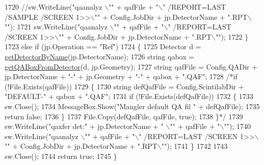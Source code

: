 \begin{DoxyCode}
1720                 \textcolor{comment}{//sw.WriteLine("qaanalyz \(\backslash\)"" + qafFile + "\(\backslash\)" /REPORT=LAST /SAMPLE /SCREEN 1>>\(\backslash\)"" +
       Config.JobDir + jp.DetectorName + ".RPT\(\backslash\)"");}
1721                 sw.WriteLine(\textcolor{stringliteral}{"qaanalyz \(\backslash\)""} + qafFile + \textcolor{stringliteral}{"\(\backslash\)" /REPORT=LAST /SCREEN 1>>\(\backslash\)""} + Config.JobDir + 
      jp.DetectorName + \textcolor{stringliteral}{".RPT\(\backslash\)""});
1722             \}
1723             \textcolor{keywordflow}{else} \textcolor{keywordflow}{if} (jp.Operation == \textcolor{stringliteral}{"Ref"})
1724             \{
1725                 Detector d = \hyperlink{class_scintilab_1_1_form_main_aff4482e0919480013a53fe56cfb374ba}{getDetectorByName}(jp.DetectorName);
1726                 \textcolor{keywordtype}{string} qabox = \hyperlink{class_scintilab_1_1_form_main_ad8de93638ebc50f712d85af269ba383d}{getQABoxFromDetector}(d, jp.Geometry);
1727                 \textcolor{keywordtype}{string} qafFile = Config.QADir + jp.DetectorName + \textcolor{stringliteral}{"-"} + jp.Geometry + \textcolor{stringliteral}{"-"} + qabox + \textcolor{stringliteral}{".QAF"};
1728                 \textcolor{comment}{/*if (!File.Exists(qafFile))}
1729 \textcolor{comment}{                \{}
1730 \textcolor{comment}{                    string defQafFile = Config.ScintilabDir + "DEFAULT-" + qabox + ".QAF";}
1731 \textcolor{comment}{                    if (!File.Exists(defQafFile))}
1732 \textcolor{comment}{                    \{}
1733 \textcolor{comment}{                        sw.Close();}
1734 \textcolor{comment}{                        MessageBox.Show("Mangler default QA fil " + defQafFile);}
1735 \textcolor{comment}{                        return false;}
1736 \textcolor{comment}{                    \}}
1737 \textcolor{comment}{                    File.Copy(defQafFile, qafFile, true);}
1738 \textcolor{comment}{                \}*/}
1739                 sw.WriteLine(\textcolor{stringliteral}{"qaxfer det:"} + jp.DetectorName + \textcolor{stringliteral}{" \(\backslash\)""} + qafFile + \textcolor{stringliteral}{"\(\backslash\)""});
1740                 sw.WriteLine(\textcolor{stringliteral}{"qaanalyz \(\backslash\)""} + qafFile + \textcolor{stringliteral}{"\(\backslash\)" /REPORT=LAST /SCREEN 1>>\(\backslash\)""} + Config.JobDir + 
      jp.DetectorName + \textcolor{stringliteral}{".RPT\(\backslash\)""});
1741             \}
1742             
1743             sw.Close();
1744             \textcolor{keywordflow}{return} \textcolor{keyword}{true};
1745         \}
\end{DoxyCode}
